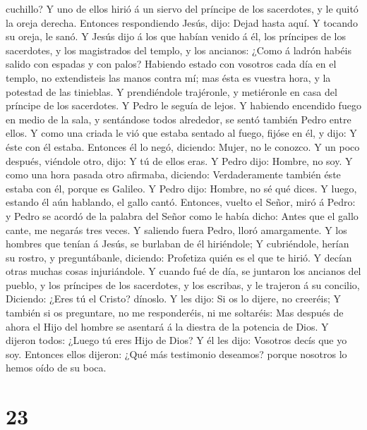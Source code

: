 cuchillo?  Y uno de ellos hirió á un siervo del príncipe de
los sacerdotes, y le quitó la oreja derecha.  Entonces
respondiendo Jesús, dijo: Dejad hasta aquí. Y tocando su oreja, le sanó.
 Y Jesús dijo á los que habían venido á él, los príncipes
de los sacerdotes, y los magistrados del templo, y los ancianos: ¿Como á
ladrón habéis salido con espadas y con palos?  Habiendo
estado con vosotros cada día en el templo, no extendisteis las manos
contra mí; mas ésta es vuestra hora, y la potestad de las tinieblas.
 Y prendiéndole trajéronle, y metiéronle en casa del
príncipe de los sacerdotes. Y Pedro le seguía de lejos.  Y
habiendo encendido fuego en medio de la sala, y sentándose todos
alrededor, se sentó también Pedro entre ellos.  Y como una
criada le vió que estaba sentado al fuego, fijóse en él, y dijo: Y éste
con él estaba.  Entonces él lo negó, diciendo: Mujer, no le
conozco.  Y un poco después, viéndole otro, dijo: Y tú de
ellos eras. Y Pedro dijo: Hombre, no soy.  Y como una hora
pasada otro afirmaba, diciendo: Verdaderamente también éste estaba con
él, porque es Galileo.  Y Pedro dijo: Hombre, no sé qué
dices. Y luego, estando él aún hablando, el gallo cantó. 
Entonces, vuelto el Señor, miró á Pedro: y Pedro se acordó de la palabra
del Señor como le había dicho: Antes que el gallo cante, me negarás tres
veces.  Y saliendo fuera Pedro, lloró amargamente.
 Y los hombres que tenían á Jesús, se burlaban de él
hiriéndole;  Y cubriéndole, herían su rostro, y
preguntábanle, diciendo: Profetiza quién es el que te hirió.
 Y decían otras muchas cosas injuriándole.  Y
cuando fué de día, se juntaron los ancianos del pueblo, y los príncipes
de los sacerdotes, y los escribas, y le trajeron á su concilio,
 Diciendo: ¿Eres tú el Cristo? dínoslo. Y les dijo: Si os
lo dijere, no creeréis;  Y también si os preguntare, no me
responderéis, ni me soltaréis:  Mas después de ahora el
Hijo del hombre se asentará á la diestra de la potencia de Dios.
 Y dijeron todos: ¿Luego tú eres Hijo de Dios? Y él les
dijo: Vosotros decís que yo soy.  Entonces ellos dijeron:
¿Qué más testimonio deseamos? porque nosotros lo hemos oído de su boca.

\hypertarget{section-22}{%
\section{23}\label{section-22}}

